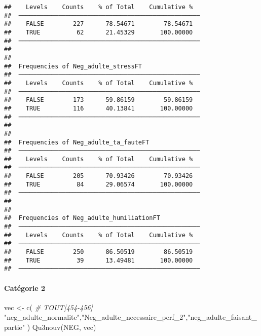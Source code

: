 \documentclass[
]{article}
\newenvironment{Shaded}{\begin{snugshade}}{\end{snugshade}}
\newcommand{\CommentTok}[1]{\textcolor[rgb]{0.56,0.35,0.01}{\textit{#1}}}
\newcommand{\FunctionTok}[1]{\textcolor[rgb]{0.00,0.00,0.00}{#1}}
\newcommand{\NormalTok}[1]{#1}
\newcommand{\OtherTok}[1]{\textcolor[rgb]{0.56,0.35,0.01}{#1}}
\newcommand{\StringTok}[1]{\textcolor[rgb]{0.31,0.60,0.02}{#1}}
\begin{document}
\begin{verbatim}
##    Levels    Counts    % of Total    Cumulative %   
##  ────────────────────────────────────────────────── 
##    FALSE        227      78.54671        78.54671   
##    TRUE          62      21.45329       100.00000   
##  ────────────────────────────────────────────────── 
## 
## 
##  Frequencies of Neg_adulte_stressFT                 
##  ────────────────────────────────────────────────── 
##    Levels    Counts    % of Total    Cumulative %   
##  ────────────────────────────────────────────────── 
##    FALSE        173      59.86159        59.86159   
##    TRUE         116      40.13841       100.00000   
##  ────────────────────────────────────────────────── 
## 
## 
##  Frequencies of Neg_adulte_ta_fauteFT               
##  ────────────────────────────────────────────────── 
##    Levels    Counts    % of Total    Cumulative %   
##  ────────────────────────────────────────────────── 
##    FALSE        205      70.93426        70.93426   
##    TRUE          84      29.06574       100.00000   
##  ────────────────────────────────────────────────── 
## 
## 
##  Frequencies of Neg_adulte_humiliationFT            
##  ────────────────────────────────────────────────── 
##    Levels    Counts    % of Total    Cumulative %   
##  ────────────────────────────────────────────────── 
##    FALSE        250      86.50519        86.50519   
##    TRUE          39      13.49481       100.00000   
##  ──────────────────────────────────────────────────
\end{verbatim}

\hypertarget{catuxe9gorie-2-5}{%
\paragraph{Catégorie 2}\label{catuxe9gorie-2-5}}

\begin{Shaded}
\begin{Highlighting}[]
\NormalTok{vec }\OtherTok{\textless{}{-}} \FunctionTok{c}\NormalTok{(   }\CommentTok{\# TOUT[454{-}456]}
  \StringTok{"neg\_adulte\_normalite"}\NormalTok{,}\StringTok{"Neg\_adulte\_necessaire\_perf\_2"}\NormalTok{,}\StringTok{"neg\_adulte\_faisant\_partie"}
\NormalTok{)}
\FunctionTok{Qu3nouv}\NormalTok{(NEG, vec)}
\end{Highlighting}
\end{Shaded}
\end{document}
